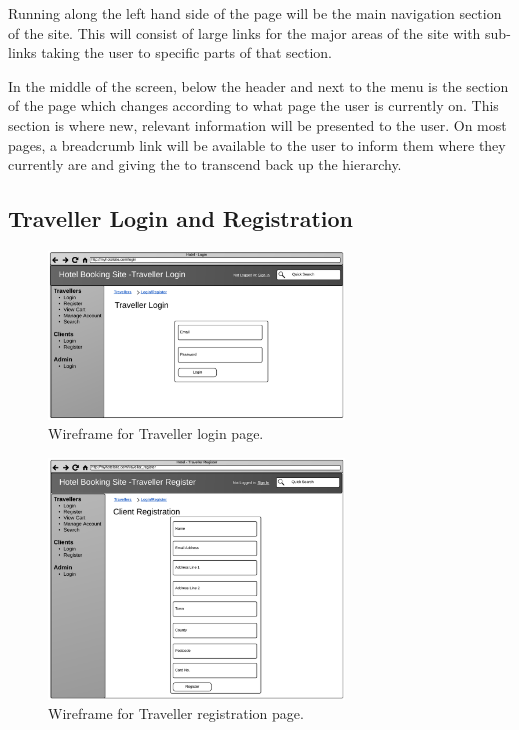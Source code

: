 \documentclass{article}
\begin{document}
Running along the left hand side of the page will be the main navigation section of the site. This will consist of large links for the major areas of the site with sub-links taking the user to specific parts of that section.

In the middle of the screen, below the header and next to the menu is the section of the page which changes according to what page the user is currently on. This section is where new, relevant information will be presented to the user. On most pages, a breadcrumb link will be available to the user to inform them where they currently are and giving the to transcend back up the hierarchy.

\subsection{Traveller Login and Registration}

\begin{figure}[H]
\centering
\includegraphics[width=0.7\textwidth]{img/wireframes/Login.png}
\caption{Wireframe for Traveller login page.}
\label{fig:wireframe-traveller-login}
\end{figure}

\begin{figure}[H]
\centering
\includegraphics[width=0.7\textwidth]{img/wireframes/TravellerRegistration.png}
\caption{Wireframe for Traveller registration page.}
\label{fig:wireframe-traveller-register}
\end{figure}
\end{document}

